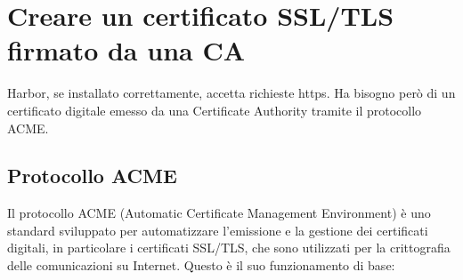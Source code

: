 \documentclass[12pt,a4paper]{report}
\begin{document}
\section{Creare un certificato SSL/TLS firmato da una CA}
Harbor, se installato correttamente, accetta richieste https. Ha bisogno però di un certificato digitale emesso da una Certificate Authority tramite il protocollo ACME. 
\subsection{Protocollo ACME}
Il protocollo ACME (Automatic Certificate Management Environment) è uno standard sviluppato per automatizzare l'emissione e la gestione dei certificati digitali, in particolare i certificati SSL/TLS, che sono utilizzati per la crittografia delle comunicazioni su Internet.
Questo è il suo funzionamento di base:
\end{document}
